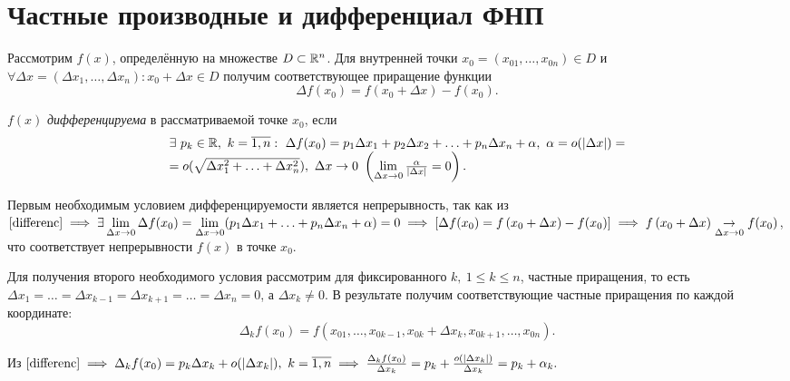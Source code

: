 \documentclass[../../main.tex]{subfiles}
\begin{document}
	\section{Частные производные и дифференциал ФНП}
	
	Рассмотрим $f(x)$, определённую на множестве $D \subset \mathbb{R}^n$. Для
	внутренней точки $x_0 = (x_{01}, \ldots, x_{0n}) \in D$ и $\forall 
	\Delta x = (\Delta x_1, \ldots, \Delta x_n): x_0 + \Delta x \in D$ получим
	соответствующее приращение функции 
	\begin{equation}
		\label{increment}
		\Delta f(x_0) = f\left(x_0 + \Delta x\right) - f(x_0).
	\end{equation}
	\begin{defn}
		$f(x)$ \emph{дифференцируема} в рассматриваемой точке $x_0$, если
		\begin{equation}
			\label{differenc}
			\begin{array}{l}
			\exists \ p_k \in \R, \ k = \overline{1,n}:\ \Delta f(x_0)= p_1 
			\Delta x_1 + p_2 \Delta x_2 + \ldots + p_n \Delta x_n + \alpha,\ 
    		\alpha = o(|\Delta x|) = \\ =o(\sqrt{\Delta x_1^2 + \ldots + \Delta
    		x_n^2}),\ \Delta x \to 0 \ \left(\lim\limits_{\Delta x \to 0} 
    		\frac{\alpha}{|\Delta x|} = 0\right).
    	    \end{array}
		\end{equation}
	\end{defn}
	
	Первым необходимым условием дифференцируемости является непрерывность, так
	как из $\eqref{differenc} \implies \exists \lim\limits_{\Delta x \to 0}
	\Delta f(x_0) = \lim\limits_{\Delta x \to 0} (p_1 \Delta x_1 + \ldots + 
	p_n \Delta x_n + \alpha) = 0 \implies [\Delta f(x_0) = f\left(x_0 + 
	\Delta x\right) - f(x_0)] \implies 
	f\left(x_0 + \Delta x\right) \underset{\Delta x \to 0}{\to} f(x_0)$, что 
	соответствует  непрерывности $f(x)$ в точке $x_0$.
	
	Для получения второго необходимого условия рассмотрим для фиксированного 
	$k, \ 1 \leq k \leq n$, частные приращения, то есть $\Delta x_1 = \ldots = 
	\Delta x_{k-1} = \Delta x_{k + 1} = \ldots = \Delta x_n = 0$, а $\Delta x_k
	\ne 0$. В результате получим соответствующие частные приращения по каждой 
	координате:
	\[\Delta_k f(x_0) = f(x_{01}, \ldots, x_{0k-1}, x_{0k} + 
	\Delta x_k, x_{0k+1}, \ldots, x_{0n}).\]
	
	Из $\eqref{differenc} \implies
	\Delta_k f(x_0) = p_k \Delta x_k + o(|\Delta x_k|),\ k = \overline{1, n}
	\implies \frac{\Delta_k f(x_0)}{\Delta x_k} = p_k + 
	\frac{o(|\Delta x_k|)}{\Delta x_k} = p_k + \alpha_k.$
	
\end{document}
